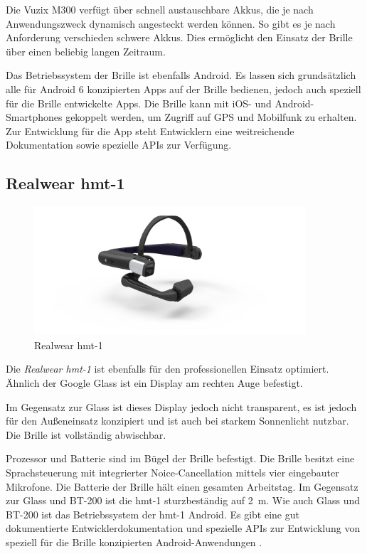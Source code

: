 Die Vuzix M300 verfügt über schnell austauschbare Akkus, die je nach Anwendungszweck dynamisch angesteckt werden können. So gibt es je nach Anforderung verschieden schwere Akkus. Dies ermöglicht den Einsatz der Brille über einen beliebig langen Zeitraum.

Das Betriebssystem der Brille ist ebenfalls Android. Es lassen sich grundsätzlich alle für Android 6 konzipierten Apps auf der Brille bedienen, jedoch auch speziell für die Brille entwickelte Apps. Die Brille kann mit iOS- und Android-Smartphones gekoppelt werden, um Zugriff auf GPS und Mobilfunk zu erhalten. Zur Entwicklung für die App steht Entwicklern eine weitreichende Dokumentation sowie spezielle APIs zur Verfügung. \cite{Vuzix2018}
%
%
%
%
%
%
\subsection{Realwear hmt-1}
\label{sec:Realwear_hmt-1}
%
\begin{figure}[htbp]
    \centering
    \includegraphics[width=0.9\textwidth]{data/bilder/HMT_1.jpg}
    \caption{Realwear hmt-1 \cite{Wire2017}}
    \label{fig:hmt1}
\end{figure}
%

Die \emph{Realwear hmt-1} ist ebenfalls für den professionellen Einsatz optimiert. Ähnlich der Google Glass ist ein Display am rechten Auge befestigt. 

Im Gegensatz zur Glass ist dieses Display jedoch nicht transparent, es ist jedoch für den Außeneinsatz konzipiert und ist auch bei starkem Sonnenlicht nutzbar. Die Brille ist vollständig abwischbar.

Prozessor und Batterie sind im Bügel der Brille befestigt. Die Brille  besitzt eine Sprachsteuerung mit integrierter Noice-Cancellation mittels vier eingebauter Mikrofone. Die Batterie der Brille hält einen gesamten Arbeitstag. Im Gegensatz zur Glass und BT-200 ist die hmt-1 sturzbeständig auf 2~m. Wie auch Glass und BT-200 ist das Betriebssystem der hmt-1 Android. Es gibt eine gut dokumentierte Entwicklerdokumentation und spezielle APIs zur Entwicklung von speziell für die Brille konzipierten Android-Anwendungen \cite{Realwear2018}.
%
